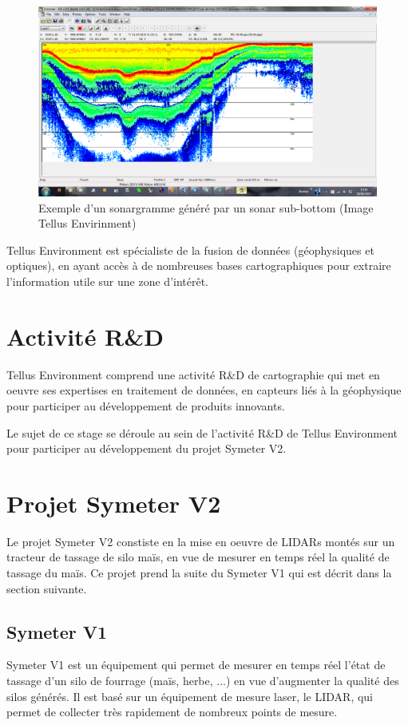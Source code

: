 \documentclass[12pt,a4paper]{report}
\begin{document}
	\begin{figure}
		\centering
		\includegraphics[width=0.7\linewidth]{img/E1790}
		\caption[sonargramme]{Exemple d'un sonargramme généré par un sonar sub-bottom (Image Tellus Envirinment)}
		\label{fig:e1790}
	\end{figure}

	
	\para Tellus Environment est spécialiste de la fusion de données (géophysiques et optiques), en ayant accès à de nombreuses bases cartographiques pour extraire l'information utile sur une zone d'intérêt.


	\section{Activité R\&D}
	
	Tellus Environment comprend une activité R\&D de cartographie qui met en oeuvre ses expertises en traitement de données, en capteurs liés à la géophysique pour participer au développement de produits innovants.
	
	\para Le sujet de ce stage se déroule au sein de l'activité R\&D de Tellus Environment pour participer au développement du projet Symeter V2.

	\section{Projet Symeter V2}
	Le projet Symeter V2 constiste en la mise en oeuvre de LIDARs montés sur un tracteur de tassage de silo maïs, en vue de mesurer en temps réel la qualité de tassage du maïs. Ce projet prend la suite du Symeter V1 qui est décrit dans la section suivante.
	
		\subsection{Symeter V1}
		\label{sec:symeterv1}
		Symeter V1 est un équipement qui permet de mesurer en temps réel l'état de tassage d'un silo de fourrage (maïs, herbe, ...) en vue d'augmenter la qualité des silos générés. Il est basé sur un équipement de mesure laser, le LIDAR, qui permet de collecter très rapidement de nombreux points de mesure. 
		
\end{document}
